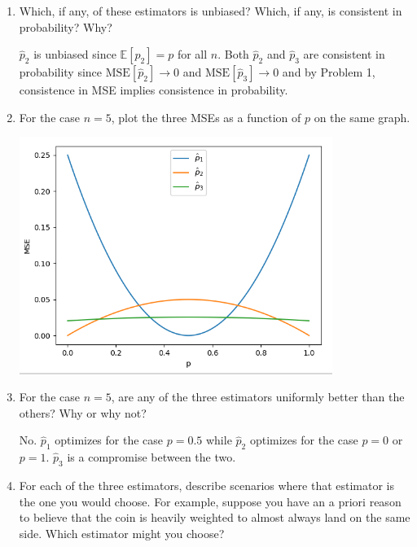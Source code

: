 \documentclass[11pt]{report}
\newcommand{\E}{\mathbb{E}}
\begin{document}
\begin{enumerate}[1.]
\begin{enumerate}
              \item Which, if any, of these estimators is unbiased?  Which, if any, is consistent in probability? Why?

                    \color{blue}
                    $\hat p_2$ is unbiased since $\E[\hat p_2] = p$ for all $n$. Both $\hat p_2$ and $\hat p_3$ are consistent in probability since $\text{MSE}[\hat p_2] \to 0$ and $\text{MSE}[\hat p_3] \to 0$ and by Problem 1, consistence in MSE implies consistence in probability.
                    \color{black}

              \item For the case $n=5$, plot the three MSEs as a function of $p$ on the same graph.

                    \begin{center}
                        \includegraphics[width=0.8\textwidth]{Images/2c.png}
                    \end{center}

              \item For the case $n=5$, are any of the three estimators uniformly better than the others?  Why or why not?

                    \color{blue}
                    No. $\hat p_1$ optimizes for the case $p = 0.5$ while $\hat p_2$ optimizes for the case $p = 0$ or $p = 1$. $\hat p_3$ is a compromise between the two.
                    \color{black}

              \item For each of the three estimators, describe scenarios where that estimator is the one you would choose.  For example, suppose you have an a priori reason to believe that the coin is heavily weighted to almost always land on the same side.  Which estimator might you choose?


\end{enumerate}
\end{enumerate}
\end{document}
